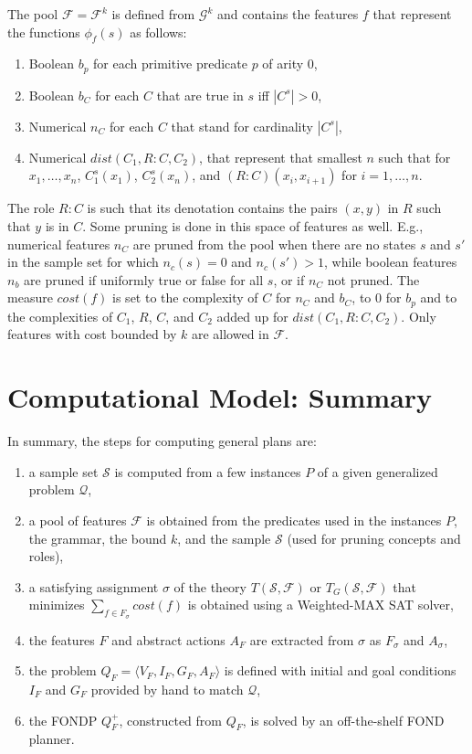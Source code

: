 \documentclass[letterpaper]{article} %
\newcommand{\tup}[1]{\langle #1 \rangle}
\newcommand{\Q}{\mathcal{Q}}
\newcommand{\F}{\mathcal{F}}
\renewcommand{\S}{\mathcal{S}}
\newcommand{\G}{\mathcal{G}}
\begin{document}
The pool $\F=\F^k$  is defined from $\G^k$ and contains
the  features $f$ that represent the functions $\phi_f(s)$ as follows:
\begin{enumerate}[{\small$\bullet$}]
\item Boolean $b_p$ for each primitive predicate $p$ of arity $0$,
\item Boolean $b_C$ for each $C$ that are true in $s$ iff $|C^s| > 0$,
\item Numerical $n_C$ for each $C$ that stand for cardinality $|C^s|$,
\item Numerical $\textit{dist}(C_1,R:C,C_2)$, that represent that smallest
  $n$ such that for $x_1, \ldots, x_n$, $C_1^s(x_1)$, $C_2^s(x_{n})$, and
  $(R:C)(x_i,x_{i+1})$ for $i=1, \ldots, n$. 
\end{enumerate}  

The role $R:C$ is such that its denotation contains the pairs $(x,y)$ in $R$
such that $y$ is in $C$.
Some pruning is done in this space of features as well. E.g., numerical
features $n_C$ are pruned from the pool when there are no states $s$ and $s'$
in the sample set for which $n_c(s)=0$ and $n_c(s') > 1$, while boolean
features $n_b$ are pruned if uniformly true or false for all $s$, or if $n_C$
not pruned. 
The measure $cost(f)$ is set to the complexity of $C$ for $n_C$ and $b_C$,
to $0$ for $b_p$ and to the complexities of $C_1$, $R$, $C$, and $C_2$ added
up for $\textit{dist}(C_1,R:C,C_2)$.
Only features with cost bounded by $k$ are allowed in $\F$.


\section{Computational Model: Summary}

In summary, the steps for computing general plans are:
\begin{enumerate}
  \item a sample set $\S$ is computed from a few instances $P$ of a given
    generalized problem $\Q$,
  \item a pool of features $\F$ is obtained from the predicates used in the
    instances $P$, the grammar, the bound $k$, and the sample $\S$ (used for
    pruning concepts and roles),
  \item a satisfying assignment $\sigma$ of the theory $T(\S,\F)$ or $T_G(\S,\F)$
    that minimizes $\sum_{f \in F_{\sigma}} cost(f)$ is obtained using a
    Weighted-MAX SAT solver,
  \item the features $F$ and abstract actions $A_F$ are extracted from $\sigma$
    as $F_{\sigma}$ and $A_{\sigma}$,
  \item the problem $Q_F=\tup{V_F,I_F,G_F,A_F}$ is defined with initial and goal
    conditions $I_F$ and $G_F$ provided by hand to match $\Q$, 
  \item the FONDP $Q^+_F$, constructed from $Q_F$, is solved by an off-the-shelf
    FOND planner.
\end{enumerate}
\end{document}
